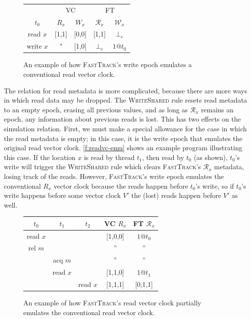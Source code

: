 \documentclass[preprint, 10pt]{sigplanconf}
\newcommand{\Tid}{t}
\newcommand{\Address}{x}
\newcommand{\Lock}{m}
\newcommand{\VC}{V}
\newcommand{\VCFont}{}
\newcommand{\ReadVC}[1]{\VCFont{R}_{#1}}
\newcommand{\WriteVC}[1]{\VCFont{W}_{#1}}
\newcommand{\FT}{\textsc{FastTrack}\xspace}
\newcommand{\Rule}[1]{\textsc{#1}}
\newcommand{\EmptyEpoch}{\bot_e}
\begin{document}
\begin{figure}[t]
\centering
\begin{tabular}{c|cc|cc|}
& \multicolumn{2}{c}{VC} & \multicolumn{2}{c}{FT} \\
$\Tid_0$ & $\ReadVC{\Address}$ & $\WriteVC{\Address}$ & $\mathcal{R}_{\Address}$ & $\mathcal{W}_{\Address}$ \\
\hline
read $\Address$ & [1,1] & [0,0] & [1,1] & $\EmptyEpoch$ \\
write $\Address$ & " & [1,0] & $\EmptyEpoch$ & $1@t_0$ \\
\end{tabular}
\caption{An example of how \FT's write epoch emulates a conventional read vector clock.}
\label{f:readvc-emu}
\end{figure}

The relation for read metadata is more complicated, because there are more ways in which read data may be dropped. The \Rule{WriteShared} rule resets read metadata to an empty epoch, erasing all previous values, and as long as $\mathcal{R}_x$ remains an epoch, any information about previous reads is lost. This has two effects on the simulation relation. First, we must make a special allowance for the case in which the read metadata is empty; in this case, it is the write epoch that emulates the original read vector clock. \autoref{f:readvc-emu} shows an example program illustrating this case. If the location $\Address$ is read by thread $\Tid_1$, then read by $\Tid_0$ (as shown), $\Tid_0$'s write will trigger the \Rule{WriteShared} rule which clears \FT's $\mathcal{R}_x$ metadata, losing track of the reads. However, \FT's write epoch emulates the conventional $R_x$ vector clock because the reads happen before $\Tid_0$'s write, so if $\Tid_0$'s write happens before some vector clock $\VC'$ the (lost) reads happen before $\VC'$ as well.

\begin{figure}[t]
\centering
\begin{tabular}{ccc|c|c|}
$\Tid_0$ & $\Tid_1$ & $\Tid_2$ & VC $\ReadVC{\Address}$ & FT $\mathcal{R}_{\Address}$ \\
\hline
read $\Address$ & &      & [1,0,0] & $1@t_0$\\
rel $\Lock$ & &      &''&''\\
& acq $\Lock$ &      &''&''\\
& read $\Address$ &      &[1,1,0]&$1@t_1$\\
& & read $\Address$      &[1,1,1]&[0,1,1]\\
\end{tabular}
\caption{An example of how \FT's read vector clock partially emulates the conventional read vector clock.}
\label{f:partial-emu}
\end{figure}
\end{document}
